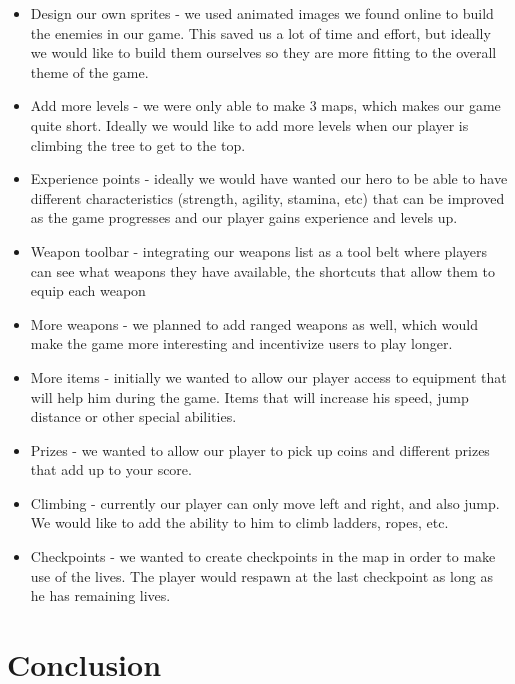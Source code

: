 \documentclass[12p]{article}
\begin{document}
\begin{itemize}
  \item Design our own sprites - we used animated images we found online to build the enemies in our game. This saved us a lot of time and effort, but ideally we would like to build them ourselves so they are more fitting to the overall theme of the game.
  \item Add more levels - we were only able to make 3 maps, which makes our game quite short. Ideally we would like to add more levels when our player is climbing the tree to get to the top.
  \item Experience points - ideally we would have wanted our hero to be able to have different characteristics (strength, agility, stamina, etc) that can be improved as the game progresses and our player gains experience and levels up.
  \item Weapon toolbar - integrating our weapons list as a tool belt where players can see what weapons they have available, the shortcuts that allow them to equip each weapon 
  \item More weapons - we planned to add ranged weapons as well, which would make the game more interesting and incentivize users to play longer.
  \item More items - initially we wanted to allow our player access to equipment that will help him during the game. Items that will increase his speed, jump distance or other special abilities.
  \item Prizes - we wanted to allow our player to pick up coins and different prizes that add up to your score.
  \item Climbing - currently our player can only move left and right, and also jump. We would like to add the ability to him to climb ladders, ropes, etc.
  \item Checkpoints - we wanted to create checkpoints in the map in order to make use of the lives. The player would respawn at the last checkpoint as long as he has remaining lives.
\end{itemize}


\newpage
\section{Conclusion}
\end{document}
